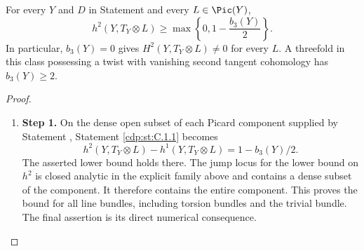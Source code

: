 \begin{proposition}\hypertarget{tag-01BP}{}\label{cdp:st:C.1.3}

For every $Y$ and $D$ in Statement  and every $L\in\Pic(Y)$,
\[
 h^2(Y,T_Y\otimes L)\geq
 \max\left\{0,1-\frac{b_3(Y)}2\right\}.
\]
In particular, $b_3(Y)=0$ gives $H^2(Y,T_Y\otimes L)\ne0$ for
every $L$. A threefold in this class possessing a twist with vanishing
second tangent cohomology has $b_3(Y)\geq2$.
\end{proposition}


\begin{proof}
\begin{enumerate}[label={$\langle1\rangle$\arabic*.},leftmargin=*]
\item 
\noindent\textbf{Step 1.} On the dense open subset of each Picard component supplied by
Statement , Statement \ref{cdp:st:C.1.1} becomes
\[
 h^2(Y,T_Y\otimes L)-h^1(Y,T_Y\otimes L)
 =1-b_3(Y)/2.
\]
The asserted lower bound holds there. The jump locus for the lower
bound on $h^2$ is closed analytic in the explicit family above and
contains a dense subset of the component. It therefore contains the
entire component. This proves the bound for all line bundles,
including torsion bundles and the trivial bundle. The final assertion
is its direct numerical consequence.

\end{enumerate}
\end{proof}